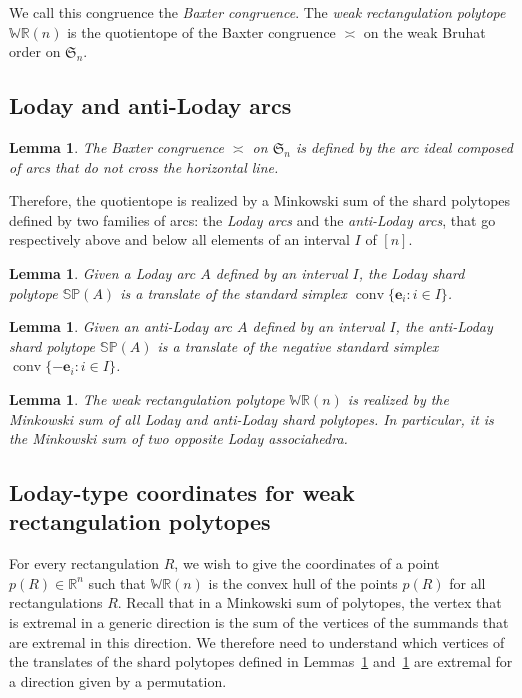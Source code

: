 \documentclass{amsart}
\newtheorem{lemma}[theorem]{Lemma}
\theoremstyle{definition}
\newcommand{\R}{\mathbb{R}} %
\newcommand{\f}[1]{\mathfrak{#1}} %
\DeclareMathOperator{\conv}{conv} %
\newcommand{\darkblue}{\color{darkblue}} %
\newcommand{\defn}[1]{\textsl{\darkblue #1}} %
\newcommand{\polytope}[1]{\mathds{#1}} %
\newcommand{\WRP}{\polytope{WR}} %
\newcommand{\SP}{\polytope{SP}}
\newcommand{\baxtereq}{\asymp}%
\begin{document}
We call this congruence the \defn{Baxter congruence}.
The \defn{weak rectangulation polytope} $\WRP(n)$ is the quotientope of the Baxter congruence $\baxtereq$ on the weak Bruhat order on $\f{S}_n$.

\subsection{Loday and anti-Loday arcs}

\begin{lemma}
The Baxter congruence $\baxtereq$ on $\f{S}_n$ is defined by the arc ideal composed of arcs that do not cross the horizontal line.
\end{lemma}

Therefore, the quotientope is realized by a Minkowski sum of the shard polytopes defined by two families of arcs: the \defn{Loday arcs} and the \defn{anti-Loday arcs}, that go respectively above and below all elements of an interval $I$ of $[n]$.

\begin{lemma}
  \label{lem:lodaysp}
  Given a Loday arc $A$ defined by an interval $I$, the Loday shard polytope $\SP(A)$ is a translate of the standard simplex $\conv \{ \mathbf{e}_i : i\in I \}$.
\end{lemma}

\begin{lemma}
  \label{lem:antilodaysp}
  Given an anti-Loday arc $A$ defined by an interval $I$, the anti-Loday shard polytope $\SP(A)$ is a translate of the negative standard simplex $\conv \{ - \mathbf{e}_i : i\in I \}$.
\end{lemma}

\begin{lemma}
  The weak rectangulation polytope $\WRP(n)$ is realized by the Minkowski sum of all Loday and anti-Loday shard polytopes. In particular, it is the Minkowski sum of two opposite Loday associahedra.
\end{lemma}

\subsection{Loday-type coordinates for weak rectangulation polytopes}

For every rectangulation $R$, we wish to give the coordinates of a point $p(R)\in\R^n$ such that $\WRP(n)$ is the convex hull of the points $p(R)$ for all rectangulations $R$.
Recall that in a Minkowski sum of polytopes, the vertex that is extremal in a generic direction is the sum of the vertices of the summands that are extremal in this direction.
We therefore need to understand which vertices of the translates of the shard polytopes defined in Lemmas~\ref{lem:lodaysp} and~\ref{lem:antilodaysp} are extremal for a direction given by a permutation.
\end{document}
